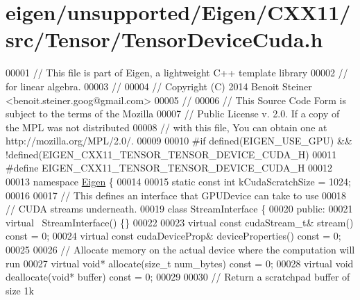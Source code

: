 \hypertarget{eigen_2unsupported_2_eigen_2_c_x_x11_2src_2_tensor_2_tensor_device_cuda_8h_source}{}\section{eigen/unsupported/\+Eigen/\+C\+X\+X11/src/\+Tensor/\+Tensor\+Device\+Cuda.h}
\label{eigen_2unsupported_2_eigen_2_c_x_x11_2src_2_tensor_2_tensor_device_cuda_8h_source}

\begin{DoxyCode}
00001 \textcolor{comment}{// This file is part of Eigen, a lightweight C++ template library}
00002 \textcolor{comment}{// for linear algebra.}
00003 \textcolor{comment}{//}
00004 \textcolor{comment}{// Copyright (C) 2014 Benoit Steiner <benoit.steiner.goog@gmail.com>}
00005 \textcolor{comment}{//}
00006 \textcolor{comment}{// This Source Code Form is subject to the terms of the Mozilla}
00007 \textcolor{comment}{// Public License v. 2.0. If a copy of the MPL was not distributed}
00008 \textcolor{comment}{// with this file, You can obtain one at http://mozilla.org/MPL/2.0/.}
00009 
00010 \textcolor{preprocessor}{#if defined(EIGEN\_USE\_GPU) && !defined(EIGEN\_CXX11\_TENSOR\_TENSOR\_DEVICE\_CUDA\_H)}
00011 \textcolor{preprocessor}{#define EIGEN\_CXX11\_TENSOR\_TENSOR\_DEVICE\_CUDA\_H}
00012 
00013 \textcolor{keyword}{namespace }\hyperlink{namespace_eigen}{Eigen} \{
00014 
00015 \textcolor{keyword}{static} \textcolor{keyword}{const} \textcolor{keywordtype}{int} kCudaScratchSize = 1024;
00016 
00017 \textcolor{comment}{// This defines an interface that GPUDevice can take to use}
00018 \textcolor{comment}{// CUDA streams underneath.}
00019 \textcolor{keyword}{class }StreamInterface \{
00020  \textcolor{keyword}{public}:
00021   \textcolor{keyword}{virtual} ~StreamInterface() \{\}
00022 
00023   \textcolor{keyword}{virtual} \textcolor{keyword}{const} cudaStream\_t& stream() \textcolor{keyword}{const} = 0;
00024   \textcolor{keyword}{virtual} \textcolor{keyword}{const} cudaDeviceProp& deviceProperties() \textcolor{keyword}{const} = 0;
00025 
00026   \textcolor{comment}{// Allocate memory on the actual device where the computation will run}
00027   \textcolor{keyword}{virtual} \textcolor{keywordtype}{void}* allocate(\textcolor{keywordtype}{size\_t} num\_bytes) \textcolor{keyword}{const} = 0;
00028   \textcolor{keyword}{virtual} \textcolor{keywordtype}{void} deallocate(\textcolor{keywordtype}{void}* buffer) \textcolor{keyword}{const} = 0;
00029 
00030   \textcolor{comment}{// Return a scratchpad buffer of size 1k}

\end{DoxyCode}
